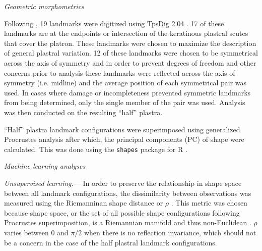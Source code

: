 \documentclass[12pt,letterpaper]{article}\usepackage{graphicx, color}
\renewcommand{\subsection}[1]{%
\bigskip
\begin{center}
\begin{large}
\normalfont\itshape #1
\end{large}
\end{center}}
\renewcommand{\subsubsection}[1]{%
\vspace{2ex}
\noindent
\textit{#1.}---}
\begin{document}
\subsection{Geometric morphometrics}
Following \citet{Angielczyk2011}, 19 landmarks were digitized using TpsDig 2.04 \citep{Rohlf2005}. 17 of these landmarks are at the endpoints or intersection of the keratinous plastral scutes that cover the platron. These landmarks were chosen to maximize the description of general plastral variation. 12 of these landmarks were chosen to be symmetrical across the axis of symmetry and in order to prevent degrees of freedom and other concerns \citep{Klingenberg2007} prior to analysis these landmarks were reflected across the axis of symmetry (i.e. midline) and the average position of each symmetrical pair was used. In cases where damage or incompleteness prevented symmetric landmarks from being determined, only the single member of the pair was used. Analysis was then conducted on the resulting ``half'' plastra.

``Half'' plastra landmark configurations were superimposed using generalized Procrustes analysis \citep{Dryden1998a} after which, the principal components (PC) of shape were calculated. This was done using the \texttt{shapes} package for R \citep{2013, Dryden2013}.


\subsection{Machine learning analyses}
\subsubsection{Unsupervised learning}
In order to preserve the relationship in shape space between all landmark configurations, the dissimilarity between observations was measured using the Riemanninan shape distance or \(\rho\) \citep{Kendall1984a,Dryden1998a}. This metric was chosen because shape space, or the set of all possible shape configurations following Procrustes superimposition, is a Riemannian manifold and thus non-Euclidean \citep{Dryden1998a}. \(\rho\) varies between 0 and \(\pi / 2\) when there is no reflection invariance, which should not be a concern in the case of the half plastral landmark configurations.
\end{document}
